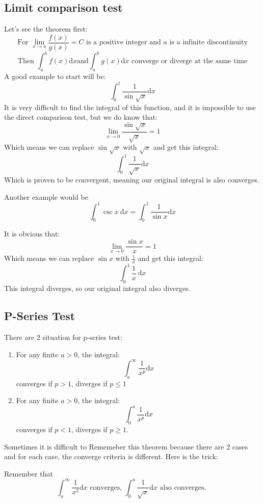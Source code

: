 \documentclass{article}
\begin{document}
\newpage
\subsection{Limit comparison test}
Let's see the theorem first:
\[
    \text{For } \lim_{x\to a} \frac{f(x)}{g(x)} = C \text{ is a positive integer and } a \text{ is a infinite discontinuity}
\]
\[
    \text{Then } \int_{a}^{b} f(x)\mathrm{d}x \text{and} \int_{a}^{b} g(x)\mathrm{d}x \text{ converge or diverge at the same time}
\]
A good example to start will be:
\[
    \int_{0}^{1} \frac{1}{\sin \sqrt{x}}\mathrm{d}x
\]
It is very difficult to find the integral of this function, and it is impossible to use the direct comparison test, but we do know that:
\[
    \lim_{x\to 0}\frac{\sin \sqrt{x}}{\sqrt{x}} = 1
\]
Which means we can replace $\sin \sqrt{x}$ with $\sqrt{x}$ and get this integral:
\[
    \int_{0}^{1}\frac{1}{\sqrt{x}}\mathrm{d}x
\]
Which is proven to be convergent, meaning our original integral is also converges.

Another example would be
\[
    \int_{0}^{1}\csc x \ \mathrm{d}x = \int_{0}^{1} \frac{1}{\sin x} \mathrm{d}x
\]

It is obvious that:
\[
    \lim_{x\to 0}\frac{\sin x}{x} = 1
\]
Which means we can replace $\sin x$ with $\frac{1}{x}$ and get this integral:
\[
    \int_{0}^{1}\frac{1}{x} \ \mathrm{d}x
\]
This integral diverges, so our original integral also diverges.

\newpage
\subsection{P-Series Test}
There are 2 situation for p-series test:

\begin{enumerate}
    \item For any finite $a>0$, the integral:
    \[
        \int_{a}^{\infty} \frac{1}{x^p} \mathrm{d}x
    \]
    converges if $p>1$, diverges if $p\leq 1$
    \item For any finite $a>0$, the integral:
    \[
        \int_{0}^{a} \frac{1}{x^p} \mathrm{d}x
    \]
    converges if $p<1$, diverges if $p\geq 1$.
\end{enumerate}
Sometimes it is difficult to Rememeber this theorem because there are 2 cases and for each case, the converge criteria is different. Here is the trick:

Remember that
\[
    \int_{a}^{\infty}\frac{1}{x^2}\mathrm{d}x \text{ converges, } 
    \int_{0}^{a}\frac{1}{\sqrt{x}}\mathrm{d}x \text{ also converges. }
\]
\end{document}
